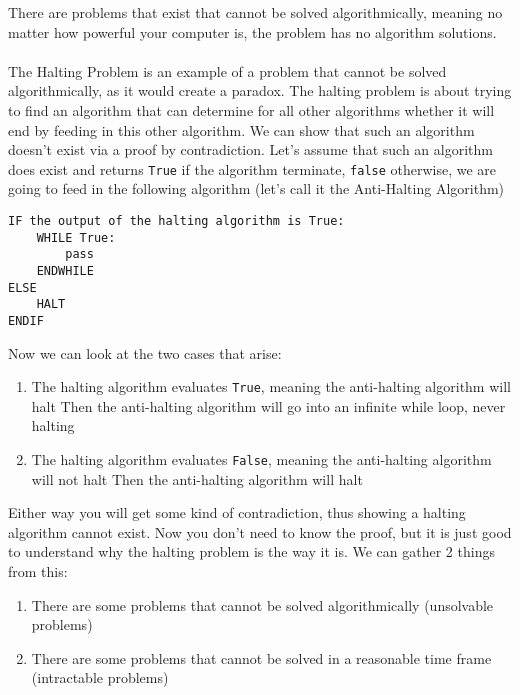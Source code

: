   \noindent
  There are problems that exist that cannot be solved algorithmically, meaning no matter how powerful your computer is, the problem has no algorithm solutions.\\  \\
  \noindent
  The Halting Problem is an example of a problem that cannot be solved algorithmically, as it would create a paradox. The halting problem is about trying to find an algorithm that can determine for all other algorithms whether it will end by feeding in this other algorithm. We can show that such an algorithm doesn't exist via a proof by contradiction. Let's assume that such an algorithm does exist and returns \verb|True| if the algorithm terminate, \verb|false| otherwise, we are going to feed in the following algorithm (let's call it the Anti-Halting Algorithm)
  \begin{verbatim}
IF the output of the halting algorithm is True:
    WHILE True:
        pass
    ENDWHILE
ELSE
    HALT
ENDIF
  \end{verbatim}
  Now we can look at the two cases that arise:
  \begin{enumerate}
  	\item The halting algorithm evaluates \verb|True|, meaning the anti-halting algorithm will halt
	  	\subitem Then the anti-halting algorithm will go into an infinite while loop, never halting
	\item The halting algorithm evaluates \verb|False|, meaning the anti-halting algorithm will not halt
		\subitem Then the anti-halting algorithm will halt
  \end{enumerate}
  
  Either way you will get some kind of contradiction, thus showing a halting algorithm cannot exist. Now you don't need to know the proof, but it is just good to understand why the halting problem is the way it is. We can gather 2 things from this:
  \begin{enumerate}
  	\item There are some problems that cannot be solved algorithmically (unsolvable problems)
  	\item There are some problems that cannot be solved in a reasonable time frame (intractable problems)
  \end{enumerate}

